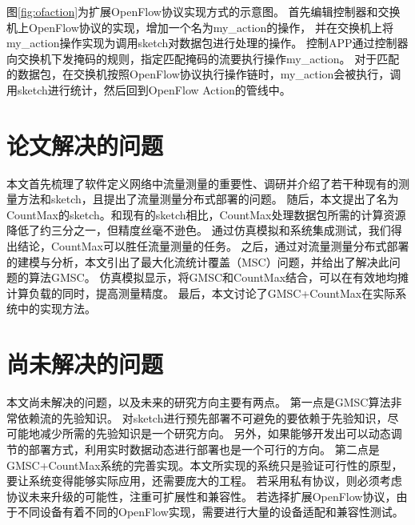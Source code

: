 图\ref{fig:ofaction}为扩展OpenFlow协议实现方式的示意图。
首先编辑控制器和交换机上OpenFlow协议的实现，增加一个名为my\_action的操作，
并在交换机上将my\_action操作实现为调用sketch对数据包进行处理的操作。
控制APP通过控制器向交换机下发掩码的规则，指定匹配掩码的流要执行操作my\_action。
对于匹配的数据包，在交换机按照OpenFlow协议执行操作链时，my\_action会被执行，调用sketch进行统计，然后回到OpenFlow Action的管线中。


\section{论文解决的问题}
本文首先梳理了软件定义网络中流量测量的重要性、调研并介绍了若干种现有的测量方法和sketch，且提出了流量测量分布式部署的问题。
随后，本文提出了名为CountMax的sketch。和现有的sketch相比，CountMax处理数据包所需的计算资源降低了约三分之一，但精度丝毫不逊色。
通过仿真模拟和系统集成测试，我们得出结论，CountMax可以胜任流量测量的任务。
之后，通过对流量测量分布式部署的建模与分析，本文引出了最大化流统计覆盖（MSC）问题，并给出了解决此问题的算法GMSC。
仿真模拟显示，将GMSC和CountMax结合，可以在有效地均摊计算负载的同时，提高测量精度。
最后，本文讨论了GMSC+CountMax在实际系统中的实现方法。

\section{尚未解决的问题}
本文尚未解决的问题，以及未来的研究方向主要有两点。
第一点是GMSC算法非常依赖流的先验知识。
对sketch进行预先部署不可避免的要依赖于先验知识，尽可能地减少所需的先验知识是一个研究方向。
另外，如果能够开发出可以动态调节的部署方式，利用实时数据动态进行部署也是一个可行的方向。
第二点是GMSC+CountMax系统的完善实现。本文所实现的系统只是验证可行性的原型，要让系统变得能够实际应用，还需要庞大的工程。
若采用私有协议，则必须考虑协议未来升级的可能性，注重可扩展性和兼容性。
若选择扩展OpenFlow协议，由于不同设备有着不同的OpenFlow实现，需要进行大量的设备适配和兼容性测试。